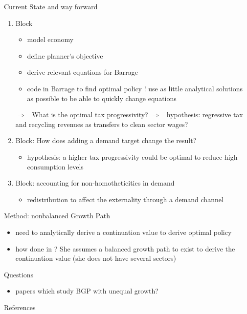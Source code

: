 \documentclass[11pt,aspectratio=169]{beamer}
\newcommand{\ar}{$\Rightarrow$ \ }
\begin{document}
\begin{frame}{Current State and way forward}
	\begin{enumerate}
		\item Block
		\begin{itemize}
			\item model economy \checkmark
			\item define planner's objective
			\item derive relevant equations for Barrage
			\item code in Barrage to find optimal policy ! use as little analytical solutions as possible to be able to quickly change equations
		\end{itemize}
		\ar What is the optimal tax progressivity? \ar hypothesis: regressive tax and recycling revenues as transfers to clean sector wages?
		\item Block: How does adding a demand target change the result?
		\begin{itemize}
			\item hypothesis: a higher tax progressivity could be optimal to reduce high consumption levels
		\end{itemize}
	\item Block: accounting for non-homotheticities in demand
	\begin{itemize}
		\item redistribution to affect the externality through a demand channel
	\end{itemize}
	\end{enumerate}
\end{frame}

\begin{frame}{Method: nonbalanced Growth Path}
	\begin{itemize}
		\item need to analytically derive a continuation value to derive optimal policy
		\item how done in \cite{Barrage2019OptimalPolicy}? She assumes a balanced growth path to exist to derive the continuation value (she does not have several sectors)
	\end{itemize}
\end{frame}

\begin{frame}{Questions}
\begin{itemize}
	\item papers which study BGP with unequal growth?
\end{itemize}
\end{frame}

\begin{frame}[shrink]{References}
	
	
	
\end{frame}
\end{document}
